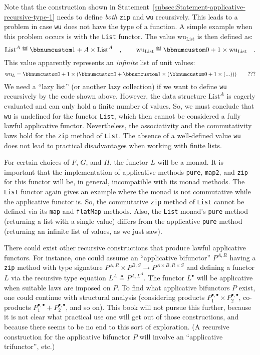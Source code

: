 Note that the construction shown in Statement~\ref{subsec:Statement-applicative-recursive-type-1}
needs to define \emph{both} \lstinline!zip! and \lstinline!wu! recursively.
This leads to a problem in case \lstinline!wu! does not have the
type of a function. A simple example when this problem occurs is with
the \lstinline!List! functor. The value $\text{wu}_{\text{List}}$
is then defined as:
\[
\text{List}^{A}\triangleq\bbnum 1+A\times\text{List}^{A}\quad,\quad\quad\text{wu}_{\text{List}}\triangleq\bbnum 0+1\times\text{wu}_{\text{List}}\quad.
\]
This value apparently represents an \emph{infinite} list of unit values:
\[
\text{wu}_{L}=\bbnum 0+1\times\left(\bbnum 0+\bbnum 1\times\left(\bbnum 0+1\times\left(...\right)\right)\right)\quad\quad???
\]
We need a \textsf{``}lazy list\textsf{''} (or another lazy
collection) if we want to define \lstinline!wu! recursively by the
code shown above. However, the data structure $\text{List}^{A}$ is
eagerly evaluated and can only hold a finite number of values. So,
we must conclude that \lstinline!wu! is undefined for the functor
\lstinline!List!, which then cannot be considered a fully lawful
applicative functor. Nevertheless, the associativity and the commutativity
laws hold for the \lstinline!zip! method of \lstinline!List!. The
absence of a well-defined value \lstinline!wu! does not lead to practical
disadvantages when working with finite lists. 

For certain choices of $F$, $G$, and $H$, the functor $L$ will
be a monad. It is important that the implementation of applicative
methods \lstinline!pure!, \lstinline!map2!, and \lstinline!zip!
for this functor will be, in general, incompatible with its monad
methods. The \lstinline!List! functor again gives an example where
the monad is not commutative while the applicative functor is. So,
the commutative \lstinline!zip! method of \lstinline!List! cannot
be defined via its \lstinline!map! and \lstinline!flatMap! methods.
Also, the \lstinline!List! monad\textsf{'}s \lstinline!pure! method (returning
a list with a single value) differs from the applicative \lstinline!pure!
method (returning an infinite list of values, as we just saw).

There could exist other recursive constructions that produce lawful
applicative functors. For instance, one could assume an \textsf{``}applicative
bifunctor\textsf{''} $P^{A,R}$ having a \lstinline!zip! method with type
signature $P^{A,R}\times P^{B,S}\rightarrow P^{A\times B,R\times S}$
and defining a functor $L$ via the recursive type equation $L^{A}\triangleq P^{A,L^{A}}$.
The functor $L^{\bullet}$ will be applicative when suitable laws
are imposed on $P$. To find what applicative bifunctors $P$ exist,
one could continue with structural analysis (considering products
$P_{1}^{\bullet,\bullet}\times P_{2}^{\bullet,\bullet}$, co-products
$P_{1}^{\bullet,\bullet}+P_{2}^{\bullet,\bullet}$, and so on). This
book will not pursue this further, because it is not clear what practical
use one will get out of those constructions, and because there seems
to be no end to this sort of exploration. (A recursive construction
for the applicative bifunctor $P$ will involve an \textsf{``}applicative
trifunctor\textsf{''}, etc.)

